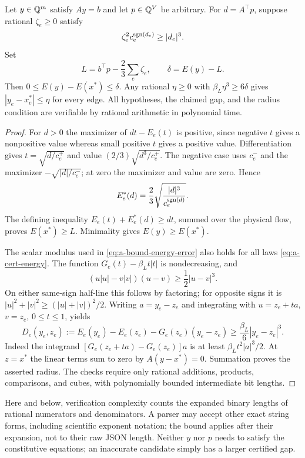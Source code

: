 \begin{proposition}
\label{prop:a-cert-energy}
Let $y\in\mathbb{Q}^m$ satisfy $Ay=b$ and let $p\in\mathbb{Q}^V$ be arbitrary.
For $d=A^\top p$, suppose rational $\zeta_e\ge0$ satisfy
\[
 \zeta_e^2 c_e^{\operatorname{sgn}(d_e)}\ge |d_e|^3.
\]
Set
\begin{equation}
 L=b^\top p-\frac23\sum_e \zeta_e,\qquad
 \delta=E(y)-L.
 \label{eq:a-cert-gap}
\end{equation}
Then $0\le E(y)-E(x^*)\le\delta$. Any rational $\eta\ge0$
with $\beta_L\eta^3\ge6\delta$ gives
$|y_e-x_e^*|\le\eta$ for every edge. All hypotheses, the claimed gap,
and the radius condition are verifiable by rational arithmetic in
polynomial time.
\end{proposition}
\begin{proof}
For $d>0$ the maximizer of $dt-E_e(t)$ is positive, since negative
$t$ gives a nonpositive value whereas small positive $t$ gives a
positive value. Differentiation gives $t=\sqrt{d/c_e^+}$ and value
$(2/3)\sqrt{d^3/c_e^+}$. The negative case uses $c_e^-$ and the
maximizer $-\sqrt{|d|/c_e^-}$; at zero the maximizer and value
are zero. Hence
\[
 E_e^*(d)=\frac23\sqrt{\frac{|d|^3}{c_e^{\operatorname{sgn}(d)}}}.
\]
The defining inequality $E_e(t)+E_e^*(d)\ge dt$, summed over the
physical flow, proves $E(x^*)\ge L$. Minimality gives
$E(y)\ge E(x^*)$.

The scalar modulus used in \cref{eq:a-bound-energy-error} also holds
for all laws \eqref{eq:a-cert-energy}. The function
$G_e(t)-\beta_Lt|t|$ is nondecreasing, and
\[
 (u|u|-v|v|)(u-v)\ge\frac12|u-v|^3.
\]
On either same-sign half-line this follows by factoring; for opposite
signs it is $|u|^2+|v|^2\ge(|u|+|v|)^2/2$.
Writing $a=y_e-z_e$ and integrating with $u=z_e+ta$, $v=z_e$,
$0\le t\le1$, yields
\begin{equation}
 D_e(y_e,z_e):=E_e(y_e)-E_e(z_e)-G_e(z_e)(y_e-z_e)
 \ge\frac{\beta_L}{6}|y_e-z_e|^3.
 \label{eq:a-cert-scalar-modulus}
\end{equation}
Indeed the integrand $[G_e(z_e+ta)-G_e(z_e)]a$ is at least
$\beta_Lt^2|a|^3/2$. At $z=x^*$ the linear terms sum to zero
by $A(y-x^*)=0$. Summation proves the asserted radius.
The checks require only rational additions, products, comparisons, and
cubes, with polynomially bounded intermediate bit lengths.
\end{proof}

Here and below, verification complexity counts the expanded binary
lengths of rational numerators and denominators. A parser may accept
other exact string forms, including scientific exponent notation; the
bound applies after their expansion, not to their raw JSON length.
Neither $y$ nor $p$ needs to satisfy the constitutive equations; an
inaccurate candidate simply has a larger certified gap.

